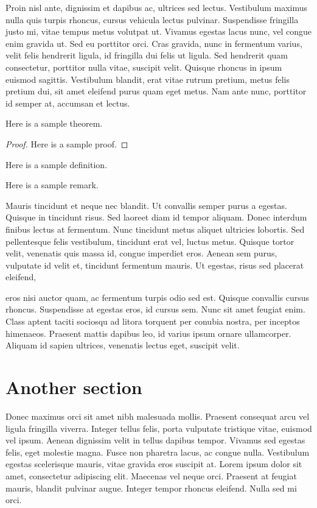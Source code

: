 \documentclass{lecnotes}
\begin{document}
	Proin nisl ante, dignissim et dapibus ac, ultrices sed lectus. Vestibulum maximus nulla quis turpis rhoncus, cursus vehicula lectus pulvinar. Suspendisse fringilla justo mi, vitae tempus metus volutpat ut. Vivamus egestas lacus nunc, vel congue enim gravida ut. Sed eu porttitor orci. Cras gravida, nunc in fermentum varius, velit felis hendrerit ligula, id fringilla dui felis ut ligula. Sed hendrerit quam consectetur, porttitor nulla vitae, suscipit velit. Quisque rhoncus in ipsum euismod sagittis. Vestibulum blandit, erat vitae rutrum pretium, metus felis pretium dui, sit amet eleifend purus quam eget metus. Nam ante nunc, porttitor id semper at, accumsan et lectus.
	\begin{theorem}%
		Here is a sample theorem.
	\end{theorem}
	\begin{proof}
		Here is a sample proof.
	\end{proof}
	\begin{definition}
		Here is a sample definition.
	\end{definition}
	\begin{remark}
		Here is a sample remark.
	\end{remark}
	Mauris tincidunt et neque nec blandit. Ut convallis semper purus a egestas. Quisque in tincidunt risus. Sed laoreet diam id tempor aliquam. Donec interdum finibus lectus at fermentum. Nunc tincidunt metus aliquet ultricies lobortis. Sed pellentesque felis vestibulum, tincidunt erat vel, luctus metus. Quisque tortor velit, venenatis quis massa id, congue imperdiet eros. Aenean sem purus, vulputate id velit et, tincidunt fermentum mauris. Ut egestas, risus sed placerat eleifend, 
	
	
	eros nisi auctor quam, ac fermentum turpis odio sed est. Quisque convallis cursus rhoncus. Suspendisse at egestas eros, id cursus sem. Nunc sit amet feugiat enim. Class aptent taciti sociosqu ad litora torquent per conubia nostra, per inceptos himenaeos. Praesent mattis dapibus leo, id varius ipsum ornare ullamcorper. Aliquam id sapien ultrices, venenatis lectus eget, suscipit velit.
	
	\section{Another section}
	Donec maximus orci sit amet nibh malesuada mollis. Praesent consequat arcu vel ligula fringilla viverra. Integer tellus felis, porta vulputate tristique vitae, euismod vel ipsum. Aenean dignissim velit in tellus dapibus tempor. Vivamus sed egestas felis, eget molestie magna. Fusce non pharetra lacus, ac congue nulla. Vestibulum egestas scelerisque mauris, vitae gravida eros suscipit at. Lorem ipsum dolor sit amet, consectetur adipiscing elit. Maecenas vel neque orci. Praesent at feugiat mauris, blandit pulvinar augue. Integer tempor rhoncus eleifend. Nulla sed mi orci.
	\appendix
\end{document}
